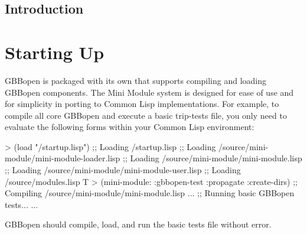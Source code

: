 \documentclass[10pt,twoside,english,pdftex]{article}
\begin{document}

\W\begin{iftex}
  \markright{}%
  \cleardoublepage
  \setcounter{page}{1}
  \pagestyle{fancy}
  \thispagestyle{fancybottom}
  \section*{Introduction}
  \label{sec:introduction}%
  \intro
\W\end{iftex}


\T\markright{}%
\T\pagestyle{plain}
\T\cleardoublepage
\W{}
\T\pagestyle{fancy}
\T\thispagestyle{fancybottom}
\W{}
\T\global\def\fnlastname{ }%
\section{Starting Up}
\label{sec:startup}%

GBBopen is packaged with its own  that
supports compiling and loading GBBopen components.  The Mini Module system
is designed for ease of use and for simplicity in porting to Common Lisp
implementations.  For example, to compile all core GBBopen  and
execute a basic trip-tests file, you only need to evaluate the following forms
within your Common Lisp environment:
%
\W\supp
\begin{example}
  > (load "/startup.lisp")
  ;; Loading /startup.lisp
  ;;  Loading /source/mini-module/mini-module-loader.lisp
  ;;   Loading /source/mini-module/mini-module.lisp
  ;;     Loading /source/mini-module/mini-module-user.lisp
  ;;  Loading /source/modules.lisp
  T
  > (mini-module: :gbbopen-test :propagate :create-dirs)
  ;; Compiling /source/mini-module/mini-module.lisp
       ...
  ;; Running basic GBBopen tests...
       ...
\end{example}
%
GBBopen should compile, load, and run the basic tests file without error.
\end{document}
